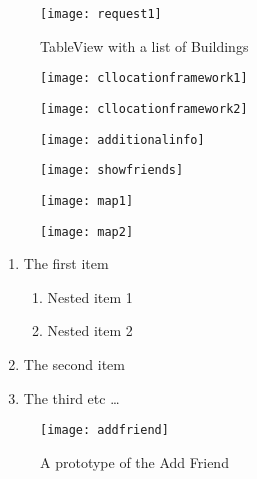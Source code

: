 \begin{figure}
\centering
\begin{minipage}{.5\textwidth}
  \centering
\texttt{[image: request1]}
\caption{TableView with a list of Buildings}
\label{fig:request1}
\end{minipage}
\end{figure}


\begin{figure}
\centering
\begin{minipage}{.5\textwidth}
  \centering
  \texttt{[image: cllocationframework1]}
  \label{fig:cllocationframework1}
\end{minipage}%
\begin{minipage}{.5\textwidth}
  \centering
  \texttt{[image: cllocationframework2]}
  \label{fig:cllocationframework2}
\end{minipage}
\end{figure}


\begin{figure}
\centering
\begin{minipage}{.5\textwidth}
  \centering
  \texttt{[image: additionalinfo]}
  \label{fig:additionalinfo}
\end{minipage}%
\begin{minipage}{.5\textwidth}
  \centering
  \texttt{[image: showfriends]}
  \label{fig:showfriends}
\end{minipage}
\end{figure}

\begin{figure}
\centering
\begin{minipage}{.5\textwidth}
  \centering
  \texttt{[image: map1]}
  \label{fig:map1}
\end{minipage}%
\begin{minipage}{.5\textwidth}
  \centering
  \texttt{[image: map2]}
  \label{fig:map2}
\end{minipage}
\end{figure}


\begin{enumerate}
  \item The first item
  \begin{enumerate}
    \item Nested item 1
    \item Nested item 2
  \end{enumerate}
  \item The second item
  \item The third etc \ldots
\end{enumerate}




\begin{figure}
\centering
\texttt{[image: addfriend]}
\caption{A prototype of the Add Friend}
\label{fig:addFriendDialog}
\end{figure}


